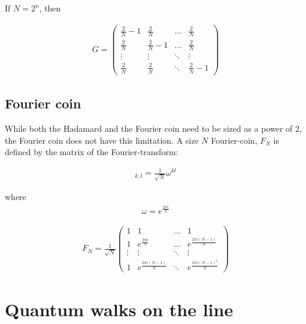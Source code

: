 If $N = 2^n$, then

\begin{align}
  G = \begin{pmatrix}
      \frac{2}{N} - 1 & \frac{2}{N} & \dots  & \frac{2}{N} \\
      \frac{2}{N} & \frac{2}{N} - 1 & \dots  & \frac{2}{N} \\
      \vdots & \vdots & \ddots & \vdots \\
      \frac{2}{N} & \frac{2}{N} & \ddots & \frac{2}{N} - 1
    \end{pmatrix}
\end{align}

\subsection{Fourier coin}

While both the Hadamard and the Fourier coin need to be sized as a power of $2$, the Fourier coin does not have this limitation. A size $N$ Fourier-coin, $F_N$ is defined by the matrix of the Fourier-transform:


\begin{align}
[F_N]_{k,l} = \frac{1}{\sqrt{N}} \omega^{kl}
\end{align}

where 
\begin{align}
    \omega = e^{\frac{2\pi{}i}{N}}
\end{align}

\begin{align}
  F_N = \frac{1}{\sqrt{N}}\begin{pmatrix}
      1 &  1 & \dots  & 1 \\
      1 &  e^{\frac{2\pi{}i}{N}} & \dots  & e^{\frac{2\pi{}i(N-1)}{N}} \\
      \vdots & \vdots & \ddots & \vdots \\
      1 &  e^{\frac{2\pi{}i(N-1)}{N}} & \ddots & e^{\frac{2\pi{}i(N-1)^2}{N}}
    \end{pmatrix}
\end{align}

\section{Quantum walks on the line}


